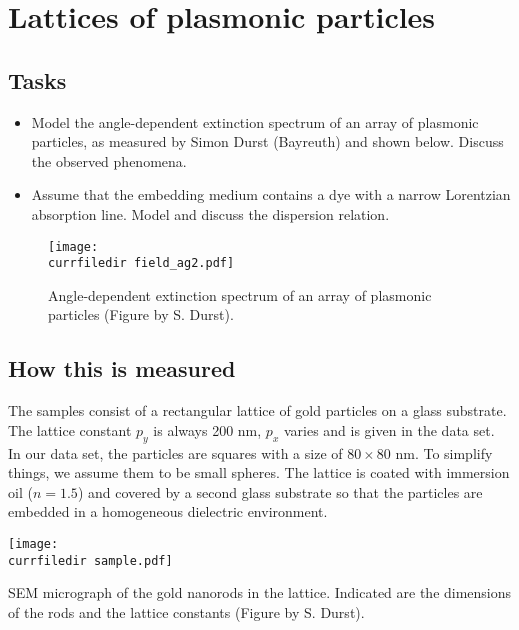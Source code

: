 \renewcommand{\lastmod}{November 18, 2021}
\renewcommand{\chapterauthors}{Markus Lippitz}


\chapter{Lattices of plasmonic particles}

\section{Tasks}

\begin{itemize}
\item Model the angle-dependent extinction spectrum of an array of plasmonic particles, as measured by Simon Durst (Bayreuth) and shown below. Discuss the observed phenomena.

\item Assume that the embedding medium contains a dye with a narrow Lorentzian absorption line. Model and discuss the dispersion relation.
\end{itemize}

\begin{figure}
\texttt{[image: \\currfiledir field\_ag2.pdf]}
\caption{Angle-dependent extinction spectrum of an array of plasmonic particles (Figure by S. Durst). \label{fig:cda_intro} }
\end{figure}

\section{How this is  measured}

The samples consist of a rectangular lattice of gold particles on a glass substrate. The lattice constant $p_y$ is always 200 nm, $p_x$ varies and is given in the data set. In our data set, the particles are squares with a size of $ 80 \times 80$ nm. To simplify things, we assume them to be small spheres. The lattice is coated with immersion oil ($n=1.5$) and covered by a second glass substrate so that the particles are embedded in a homogeneous dielectric environment.

\begin{marginfigure}
\texttt{[image: \\currfiledir sample.pdf]}
\caption{SEM micrograph of the gold nanorods in the lattice. Indicated are the dimensions of the rods and the lattice constants (Figure by S. Durst).}
\end{marginfigure}

